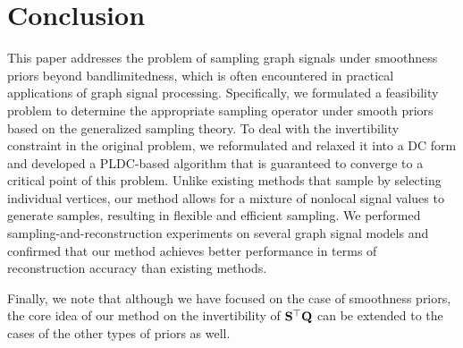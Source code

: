\documentclass[10pt,journal]{IEEEtran}
\theoremstyle{plain}
\begin{document}
\section{Conclusion}
This paper addresses the problem of sampling graph signals under smoothness priors beyond bandlimitedness, which is often encountered in practical applications of graph signal processing. Specifically, we formulated a feasibility problem to determine the appropriate sampling operator under smooth priors based on the generalized sampling theory. To deal with the invertibility constraint in the original problem, we reformulated and relaxed it into a DC form and developed a PLDC-based algorithm that is guaranteed to converge to a critical point of this problem. Unlike existing methods that sample by selecting individual vertices, our method allows for a mixture of nonlocal signal values to generate samples, resulting in flexible and efficient sampling. We performed sampling-and-reconstruction experiments on several graph signal models and confirmed that our method achieves better performance in terms of reconstruction accuracy than existing methods.

Finally, we note that although we have focused on the case of smoothness priors, the core idea of our method on the invertibility of $\mathbf{S}^\top\mathbf{Q}$ can be extended to the cases of the other types of priors as well.




% 

\end{document}
